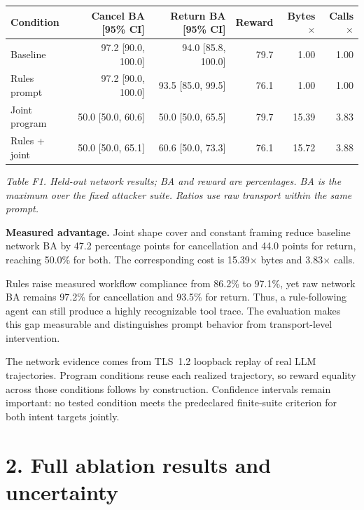 \documentclass[10pt,letterpaper]{article}
\newcommand{\note}[1]{\par\noindent\colorbox{blue!5}{\parbox{\dimexpr\linewidth-2\fboxsep\relax}{#1}}\par}
\begin{document}
\begin{center}\small
\begin{tabular}{@{}lrrrrr@{}}\toprule
Condition & Cancel BA [95\% CI] & Return BA [95\% CI] & Reward & Bytes$\times$ & Calls$\times$\\\midrule
Baseline & 97.2 [90.0, 100.0] & 94.0 [85.8, 100.0] & 79.7 & 1.00 & 1.00\\
Rules prompt & 97.2 [90.0, 100.0] & 93.5 [85.0, 99.5] & 76.1 & 1.00 & 1.00\\
Joint program & 50.0 [50.0, 60.6] & 50.0 [50.0, 65.5] & 79.7 & 15.39 & 3.83\\
Rules + joint & 50.0 [50.0, 65.1] & 60.6 [50.0, 73.3] & 76.1 & 15.72 & 3.88\\
\bottomrule\end{tabular}
\end{center}
\noindent\textit{Table F1. Held-out network results; BA and reward are percentages. BA is the maximum over the fixed attacker suite. Ratios use raw transport within the same prompt.}
\par\medskip

\note{\textbf{Measured advantage.} Joint shape cover and constant framing reduce baseline network BA by 47.2 percentage points for cancellation and 44.0 points for return, reaching 50.0\% for both. The corresponding cost is 15.39$\times$ bytes and 3.83$\times$ calls.}

Rules raise measured workflow compliance from 86.2\% to 97.1\%, yet raw network BA remains 97.2\% for cancellation and 93.5\% for return. Thus, a rule-following agent can still produce a highly recognizable tool trace. The evaluation makes this gap measurable and distinguishes prompt behavior from transport-level intervention.

The network evidence comes from TLS~1.2 loopback replay of real LLM trajectories. Program conditions reuse each realized trajectory, so reward equality across those conditions follows by construction. Confidence intervals remain important: no tested condition meets the predeclared finite-suite criterion for both intent targets jointly.
\clearpage
\section*{2. Full ablation results and uncertainty}
\end{document}
